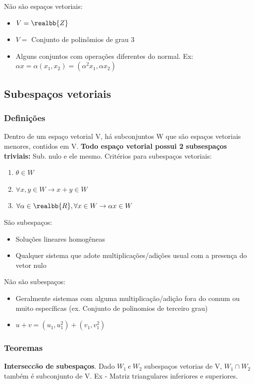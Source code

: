 \documentclass[letterpaper, 11pt]{article}
\begin{document}
Não são espaços vetoriais:
\begin{itemize}
\item \(V = \realbb{Z}\)
\item \(V =\) Conjunto de polinômios de grau 3
\item Alguns conjuntos com operações diferentes do normal. Ex: \(\alpha x = \alpha (x_1, x_2) = (\alpha ^2 x_1, \alpha x_2)\)
\end{itemize}

\subsection{Subespaços vetoriais}
\label{sec:orgddd055a}
\subsubsection{Definições}
\label{sec:org62f49b5}
Dentro de um espaço vetorial V, há subconjuntos W que são espaços vetoriais menores, contidos em V. \textbf{Todo espaço vetorial possui 2 subsespaços triviais:} Sub. nulo e ele mesmo.
Critérios para subespaços vetoriais:
\begin{enumerate}
\item \(\theta \in W\)
\item \(\forall x, y \in W \rightarrow x + y \in W\)
\item \(\forall \alpha \in \realbb{R}, \forall x \in W \rightarrow \alpha x \in W\)
\end{enumerate}
São subespaços:
\begin{itemize}
\item Soluções lineares homogêneas
\item Qualquer sistema que adote multiplicações/adições usual com a presença do vetor nulo
\end{itemize}
Não são subespaços:
\begin{itemize}
\item Geralmente sistemas com alguma multiplicação/adição fora do comum ou muito específicas (ex. Conjunto de polinomios de terceiro grau)
\item \(u + v = (u_1 , u_1^2) + (v_1, v_1^2)\)
\end{itemize}
\subsubsection{Teoremas}
\label{sec:org257be91}
\textbf{Interseccão de subespaços}. Dado \(W_1 \  e \  W_2\) subespaços vetorias de V, \(W_1 \cap W_2\) também é subconjunto de V. Ex - Matriz triangulares inferiores e superiores.
\end{document}
